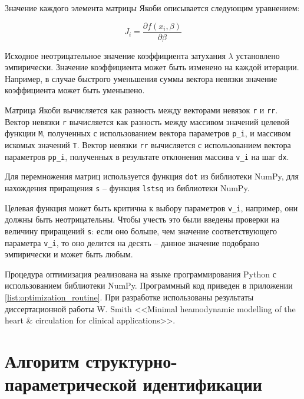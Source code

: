 
Значение каждого элемента матрицы Якоби описывается следующим уравнением: 

\begin{equation}
	J_i = \frac{\partial f(x_i, \beta)}{\partial \beta}
\end{equation}

Исходное неотрицательное значение коэффициента затухания $\lambda$ установлено эмпирически. Значение коэффициента может быть изменено на каждой итерации. Например, в случае быстрого уменьшения суммы вектора невязки значение коэффициента может быть уменьшено. 

Матрица Якоби вычисляется как разность между векторами невязок \verb!r! и \verb!rr!. Вектор невязки \verb!r! вычисляется как разность между массивом значений целевой функции \verb!M!, полученных с использованием вектора параметров \verb!p_i!, и массивом искомых значений \verb!T!. Вектор невязки \verb!rr! вычисляется с использованием вектора параметров \verb!pp_i!, полученных в результате отклонения массива \verb!v_i! на шаг \verb!dx!. 

Для перемножения матриц используется функция \verb!dot! из библиотеки NumPy, для нахождения приращения \verb!s! -- функция \verb!lstsq! из библиотеки NumPy.

Целевая функция может быть критична к выбору параметров \verb!v_i!, например, они должны быть неотрицательны. Чтобы учесть это были введены проверки на величину приращений \verb!s!: если оно больше, чем значение соответствующего параметра \verb!v_i!, то оно делится на десять -- данное значение подобрано эмпирически и может быть любым. 

Процедура оптимизация реализована на языке программирования Python с использованием библиотеки NumPy. Программный код приведен в приложении \ref{list:optimization_routine}. При разработке использованы результаты диссертационной работы W. Smith <<Minimal heamodynamic modelling of the heart \& circulation for clinical applications>>.

\section{Алгоритм структурно-параметрической идентификации}

